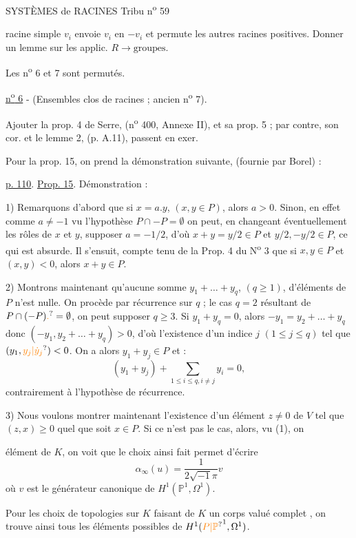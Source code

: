 SYSTÈMES de RACINES \hfill Tribu n\textsuperscript{o} 59

racine simple $v_i$ envoie $v_i$ en $-v_i$ et permute les autres racines positives. Donner un lemme sur les applic. $R\longrightarrow\text{groupes}$.

Les n\textsuperscript{o} 6 et 7 sont permutés.

\uline{n\textsuperscript{o} 6} - (Ensembles clos de racines ; ancien n\textsuperscript{o} 7).

Ajouter la prop. 4 de Serre, (n\textsuperscript{o} 400, Annexe II), et sa prop. 5 ; par contre, son cor. et le lemme 2, (p. A.11), passent en exer.

Pour la prop. 15, on prend la démonstration suivante, (fournie par Borel) :

\uline{p. 110}. \uline{Prop. 15}. Démonstration :

1) Remarquons d'abord que si $x=a.y$, $(x,y\in P)$, alors $a>0$. Sinon, en effet comme $a\neq-1$ vu l'hypothèse $P\cap-P=\emptyset$ on peut, en changeant éventuellement les rôles de $x$ et $y$, supposer $a=-1/2$, d'où $x+y=y/2\in P$ et $y/2,-y/2\in P$, ce qui est absurde. Il s'ensuit, compte tenu de la Prop. 4 du N\textsuperscript{o} 3 que si $x,y\in P$ et $(x,y)<0$, alors $x+y\in P$.

2) Montrons maintenant qu'aucune somme $y_1+\ldots+y_q$, $(q\geq 1)$, d'éléments de $P$ n'est nulle. On procède par récurrence sur $q$ ; le cas $q=2$ résultant de $P\cap(-P)\unsure{.}=\emptyset$, on peut supposer $q\geq 3$. Si $y_1+y_q=0$, alors $-y_1=y_2+\ldots+y_q$ donc $(-y_1,y_2+\ldots+y_q)>0$, d'où l'existence d'un indice $j$ $(1\leq j\leq q)$ tel que $(y_1,\unsure{y_j|\dot y_j})<0$. On a alors $y_1+y_j\in P$ et :
\[
 (y_1+y_j)+\textstyle\sum_{1\leq i\leq q,i\neq j}y_i=0,
\]
contrairement à l'hypothèse de récurrence.

3) Nous voulons montrer maintenant l'existence d'un élément $z\neq 0$ de $V$ tel que $(z,x)\geq 0$ quel que soit $x\in P$. Si ce n'est pas le cas, alors, vu (1), on

élément de $K$, on voit que le choix ainsi fait permet d'écrire
\[
 \alpha_\infty(u)=\frac{1}{2\sqrt{-1}\pi}v
\]
où $v$ est le générateur canonique de $H^1(\mathbb P^1,\Omega^1)$.

Pour les choix  de topologies sur $K$ faisant de $K$ un corps valué complet , on trouve ainsi tous les éléments possibles de $H^1(\unsure{P|\mathbb P}^1,\Omega^1)$.

